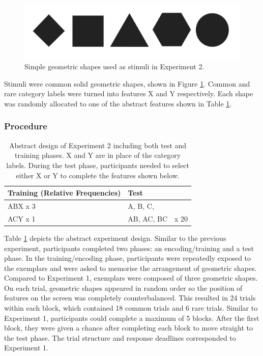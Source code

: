 \documentclass[10pt,letterpaper]{article}
\begin{document}
\begin{figure}
  \begin{center}
    \caption{Simple geometric shapes used as stimuli in Experiment 2.}
    \label{figure:exp2-stimuli}
    \includegraphics[scale=0.15]{figures/experiment_2_stimuli.pdf}
  \end{center}
\end{figure}

Stimuli were common solid geometric shapes, shown in Figure \ref*{figure:exp2-stimuli}.
Common and rare category labels were turned into features X and Y respectively.
Each shape was randomly allocated to one of the abstract features shown in Table \ref*{tab:abstract-exp2}.

\subsubsection{Procedure}

\begin{table}[!ht]
  \begin{center}
    \caption{Abstract design of Experiment 2 including both test and training phases. X and Y are in place of the category labels. During the test phase, participants needed to select either X or Y to complete the features shown below.\\}
    \label{tab:abstract-exp2}
    \begin{tabular}{llr} %
      \textbf{Training (Relative Frequencies)} & \textbf{Test}& \\
      \hline
      ABX x 3 &  A, B, C,        & \\
      ACY x 1 &  AB, AC, BC      & x 20 \\
      \hline
    \end{tabular}
  \end{center}
\end{table}

Table \ref*{tab:abstract-exp2} depicts the abstract experiment design.
Similar to the previous experiment, participants completed two phases: an encoding/training and a test phase.
In the training/encoding phase, participants were repeatedly exposed to the exemplars and were asked to memorise the arrangement of geometric shapes.
Compared to Experiment 1, exemplars were composed of three geometric shapes.
On each trial, geometric shapes appeared in random order so the position of features on the screen was completely counterbalanced.
This resulted in 24 trials within each block, which contained 18 common trials and 6 rare trials.
Similar to Experiment 1, participants could complete a maximum of 5 blocks.
After the first block, they were given a chance after completing each block to move straight to the test phase.
The trial structure and response deadlines corresponded to Experiment 1.
\end{document}
